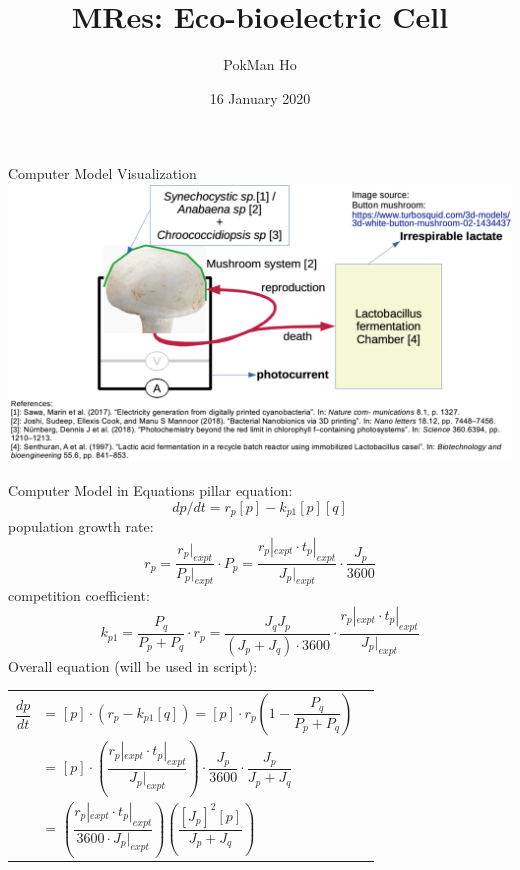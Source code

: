 \documentclass[xcolor=x11names,compress]{beamer}
\title{MRes: Eco-bioelectric Cell}
\author{PokMan Ho}
\date{16 January 2020}
\begin{document}
\begin{frame}
    \maketitle
\end{frame}

\begin{frame}{Computer Model Visualization}
    \includegraphics[width=\linewidth]{figure/proposed_model.png}
\end{frame}

\begin{frame}{Computer Model in Equations}
    pillar equation:
    \begin{equation}\label{eq:main}
        dp/dt = r_p [p] - k_{p1} [p][q]
    \end{equation}
    population growth rate:
    \begin{equation}\label{eq:growth}
        r_p = \dfrac{r_p|_{expt}}{P_p|_{expt}}\cdot P_p = \dfrac{r_p|_{expt}\cdot t_p|_{expt}}{J_p|_{expt}}\cdot\dfrac{J_p}{3600}
    \end{equation}
    competition coefficient:
    \begin{equation}\label{eq:compete}
        k_{p1} = \dfrac{P_q}{P_p + P_q}\cdot r_p = \dfrac{J_q J_p}{(J_p + J_q)\cdot3600}\cdot \dfrac{r_p|_{expt}\cdot t_p|_{expt}}{J_p|_{expt}}
    \end{equation}
    Overall equation (will be used in script):
    \begin{tabular}{rll}
        $\dfrac{dp}{dt}$ & = $[p]\cdot(r_p - k_{p1}[q]) = [p]\cdot r_p(1-\dfrac{P_q}{P_p + P_q})$\\
         & = $[p]\cdot(\dfrac{r_p|_{expt}\cdot t_p|_{expt}}{J_p|_{expt}})\cdot\dfrac{J_p}{3600}\cdot\dfrac{J_p}{J_p + J_q}$ \\
         & = $(\dfrac{r_p|_{expt}\cdot t_p|_{expt}}{3600\cdot J_p|_{expt}})(\dfrac{[J_p]^2 [p]}{J_p + J_q})$
    \end{tabular}
\end{frame}
\end{document}
